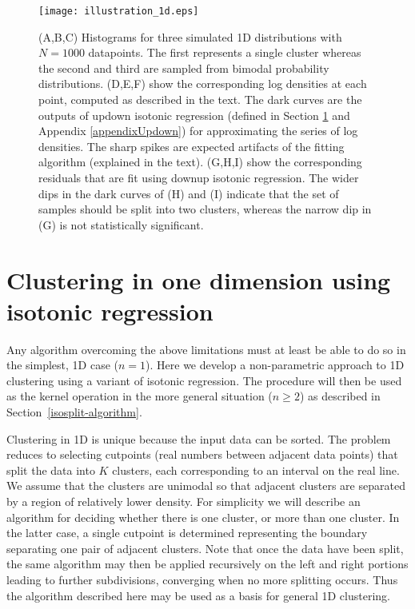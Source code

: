 \documentclass[10pt]{article}
\begin{document}
\begin{figure}
\begin{center}
\texttt{[image: illustration\_1d.eps]}
\end{center}
\caption{
(A,B,C) Histograms for three simulated 1D distributions with $N=1000$ datapoints. The first represents a single cluster whereas the second and third are sampled from bimodal probability distributions. (D,E,F) show the corresponding log densities at each point, computed as described in the text. The dark curves are the outputs of updown isotonic regression (defined in Section \ref{clustering_1d} and Appendix \ref{appendixUpdown}) for approximating the series of log densities. The sharp spikes are expected artifacts of the fitting algorithm (explained in the text). (G,H,I) show the corresponding residuals that are fit using downup isotonic regression. The wider dips in the dark curves of (H) and (I) indicate that the set of samples should be split into two clusters, whereas the narrow dip in (G) is not statistically significant.
}
\label{fig:plots_1d}
\end{figure}

\section {Clustering in one dimension using isotonic regression}
\label{clustering_1d}

Any algorithm overcoming the above limitations must at least be able to do so in the simplest, 1D case ($n=1$). Here we develop a non-parametric approach to 1D clustering using a variant of isotonic regression. The procedure will then be used as the kernel operation in the more general situation ($n\geq2$) as described in Section~\ref{isosplit-algorithm}.

Clustering in 1D is unique because the input data can be sorted. The problem reduces to selecting cutpoints (real numbers between adjacent data points) that split the data into $K$ clusters, each corresponding to an interval on the real line. We assume that the clusters are unimodal so that adjacent clusters are separated by a region of relatively lower density. For simplicity we will describe an algorithm for deciding whether there is one cluster, or more than one cluster. In the latter case, a single cutpoint is determined representing the boundary separating one pair of adjacent clusters. Note that once the data have been split, the same algorithm may then be applied recursively on the left and right portions leading to further subdivisions, converging when no more splitting occurs. Thus the algorithm described here may be used as a basis for general 1D clustering.
\end{document}
